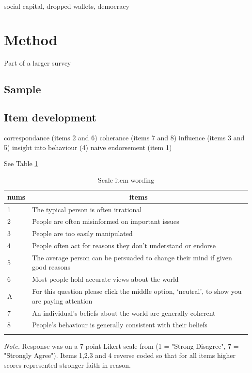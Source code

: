 \documentclass[
  ,jou,floatsintext]{apa6}
\begin{document}
social capital, dropped wallets, democracy

\hypertarget{method}{%
\section{Method}\label{method}}

Part of a larger survey

\hypertarget{sample}{%
\subsection{Sample}\label{sample}}

\hypertarget{item-development}{%
\subsection{Item development}\label{item-development}}

correspondance (items 2 and 6)
coherance (items 7 and 8)
influence (items 3 and 5)
insight into behaviour (4)
naive endorsement (item 1)

See Table \ref{tab:items}

\begin{table}[tbp]

\begin{center}
\begin{threeparttable}

\caption{\label{tab:items}Scale item wording}

\begin{tabular}{ll}
\toprule
nums & \multicolumn{1}{c}{items}\\
\midrule
1 & The typical person is often irrational\\
2 & People are often misinformed on important issues\\
3 & People are too easily manipulated\\
4 & People often act for reasons they don’t understand or endorse\\
5 & The average person can be persuaded to change their mind if given good reasons\\
6 & Most people hold accurate views about the world\\
A & For this question please click the middle option, ‘neutral’, to show you are paying attention\\
7 & An individual's beliefs about the world are generally coherent\\
8 & People's behaviour is generally consistent with their beliefs\\
\bottomrule
\addlinespace
\end{tabular}

\begin{tablenotes}[para]
\normalsize{\textit{Note.} Response was on a 7 point Likert scale from (1 = "Strong Disagree", 7 = "Strongly Agree"). Items 1,2,3 and 4 reverse coded so that for all items higher scores represented stronger faith in reason.}
\end{tablenotes}

\end{threeparttable}
\end{center}

\end{table}
\end{document}

